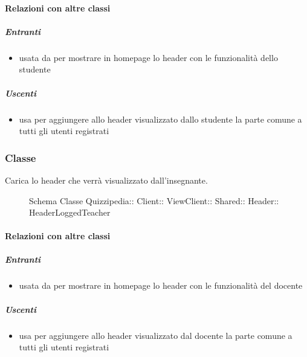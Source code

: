 \paragraph{Relazioni con altre classi}
\subparagraph{Entranti}
\begin{itemize}
\item usata da  per mostrare in homepage lo header con le funzionalità dello studente
\end{itemize}
\subparagraph{Uscenti}
\begin{itemize}
\item usa  per aggiungere allo header visualizzato dallo studente la parte comune a tutti gli utenti registrati
\end{itemize}
\subsubsection{Classe }
Carica lo header che verrà visualizzato dall'insegnante.
\begin{figure}[H]
\centering
\noindent{}
\caption[Schema Classe HeaderLoggedTeacher]{Schema Classe Quizzipedia:: Client:: ViewClient:: Shared:: Header:: HeaderLoggedTeacher}
\end{figure}
\paragraph{Relazioni con altre classi}
\subparagraph{Entranti}
\begin{itemize}
\item usata da  per mostrare in homepage lo header con le funzionalità del docente
\end{itemize}
\subparagraph{Uscenti}
\begin{itemize}
\item usa  per aggiungere allo header visualizzato dal docente la parte comune a tutti gli utenti registrati
\end{itemize}
